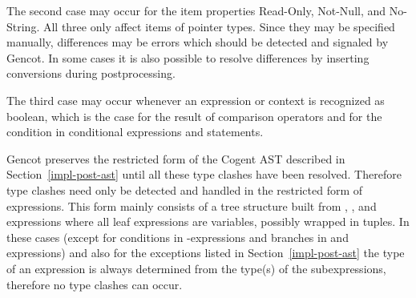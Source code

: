 The second case may occur for the item properties Read-Only, Not-Null, and No-String. All three only affect items of pointer
types. Since they may be specified manually, differences may be errors which should be detected and signaled by Gencot. In some
cases it is also possible to resolve differences by inserting conversions during postprocessing.

The third case may occur whenever an expression or context is recognized as boolean, which is the case for the result of
comparison operators and for the condition in conditional expressions and statements.

Gencot preserves the restricted form of the Cogent AST described in Section~\ref{impl-post-ast} until all these type clashes
have been resolved. Therefore type clashes need only be detected and handled in the restricted form of expressions. This form
mainly consists of a tree structure built from , , and  expressions where all leaf expressions
are variables, possibly wrapped in tuples. In these cases (except for conditions in -expressions and branches in 
and  expressions) and also for the exceptions listed in Section~\ref{impl-post-ast} the type of an expression is
always determined from the type(s) of the subexpressions, therefore no type clashes can occur.

